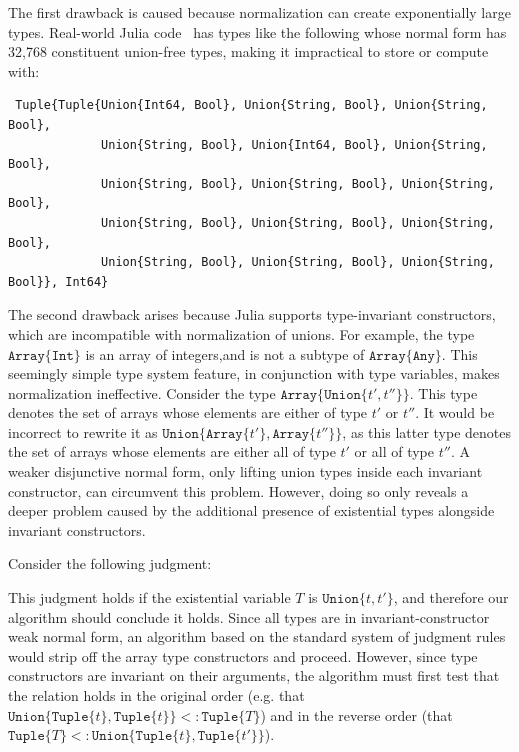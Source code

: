 \documentclass[a4paper,english]{lipics-v2019}
\newcommand{\xt}[1]{\texttt{#1}}
\newcommand{\union}[2]{\xt{Union\{}#1,#2\xt{\}}}
\newcommand{\tuple}[1]{\xt{Tuple\{}#1\xt{\}}}
\newcommand{\arrayt}[1]{\xt{Array\{}#1\xt{\}}}
\begin{document}
The first drawback is caused because normalization can create exponentially
large types. Real-world Julia code~\cite{DBLP:NardelliBPCBV18} has types like the
following whose normal form has 32,768
constituent union-free types, making it impractical to store or compute with:

\vspace{-2mm}
\begin{small}
\begin{verbatim}
 Tuple{Tuple{Union{Int64, Bool}, Union{String, Bool}, Union{String, Bool}, 
             Union{String, Bool}, Union{Int64, Bool}, Union{String, Bool}, 
             Union{String, Bool}, Union{String, Bool}, Union{String, Bool}, 
             Union{String, Bool}, Union{String, Bool}, Union{String, Bool}, 
             Union{String, Bool}, Union{String, Bool}, Union{String, Bool}}, Int64}
\end{verbatim}
\end{small}
\vspace{-2mm}

The second drawback arises because Julia supports type-invariant
constructors, which are incompatible with normalization of unions. For example,
the type $\arrayt{\xt{Int}}$ is an array of integers,and is not a
subtype of $\arrayt{\xt{Any}}$. This seemingly simple type system feature, in
conjunction with type variables, makes normalization ineffective.  Consider
the type {\small \(\arrayt{\union{t'}{t''}}\)}. This type denotes the set of
arrays whose elements are either of type {\small $t'$} or {\small $t''$}.
It would be incorrect to rewrite it as {\small
  \(\union{\arrayt{t'}}{\arrayt{t''}}\)}, as this latter type denotes the
set of arrays whose elements are either all of type {\small $t'$} or all of
type {\small$t''$}. A weaker disjunctive normal form, only lifting union
types inside each invariant constructor, can circumvent this
problem. However, doing so only reveals a deeper problem caused by the additional presence
of existential types alongside invariant constructors. 

Consider the following judgment:

%
\vspace{-4mm}{\small\[
  \arrayt{\union{\tuple{t}}{\tuple{t'}}} \ \ <:\ \ \exists T\,.\, \arrayt{\tuple{T}}
\]}\vspace{-4mm}
%

\noindent  This judgment holds if the existential variable {\small$T$} is
{\small $\union{t}{t'}$}, and therefore our algorithm should conclude it
holds. Since all types are in invariant-constructor weak normal form, an algorithm based on the
standard system of judgment rules would strip off the array type constructors
and proceed.  However, since type constructors are invariant on their
arguments, the algorithm must first test that the relation holds in the original order
(e.g. that {\small$\union{\tuple{t}}{\tuple{t}}<:\tuple{T}$}) and in the
reverse order (that {\small$\tuple{T}<:\union{\tuple{t}}{\tuple{t'}}$}).
\end{document}
